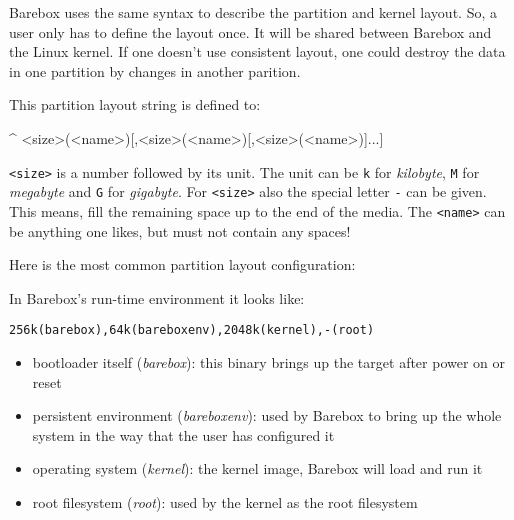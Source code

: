 %
%

Barebox uses the same syntax to describe the partition and kernel layout. So,
a user only has to define the layout once. It will be shared between Barebox
and the Linux kernel. If one doesn't use consistent layout, one could destroy
the data in one partition by changes in another parition.

This partition layout string is defined to:

\begin{ptxshell}[escapechar=|]{^}
<size>(<name>)[,<size>(<name>)[,<size>(<name>)]...]
\end{ptxshell}

\texttt{<size>} is a number followed by its unit. The unit can be \texttt{k} for
\textit{kilobyte}, \texttt{M} for \textit{megabyte} and \texttt{G} for
\textit{gigabyte}. For \texttt{<size>} also the special letter \texttt{-}
can be given. This means, fill the remaining space up to the end of the media. The
\texttt{<name>} can be anything one likes, but must not contain any spaces!

Here is the most common partition layout configuration:

In Barebox's run-time environment it looks like:

\texttt{256k(barebox),64k(bareboxenv),2048k(kernel),-(root)}

\begin{itemize}
	\item bootloader itself (\textit{barebox}): this binary brings up the target
	      after power on or reset
	\item persistent environment (\textit{bareboxenv}): used by Barebox to bring up
	      the whole system in the way that the user has configured it
	\item operating system (\textit{kernel}): the kernel image, Barebox will load
	      and run it
	\item root filesystem (\textit{root}): used by the kernel as the root
	      filesystem
\end{itemize}


